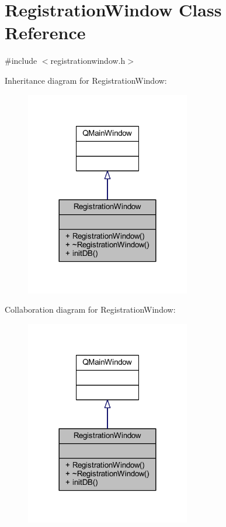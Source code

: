\hypertarget{class_registration_window}{}\section{Registration\+Window Class Reference}
\label{class_registration_window}


{\ttfamily \#include $<$registrationwindow.\+h$>$}



Inheritance diagram for Registration\+Window\+:
\nopagebreak
\begin{figure}[H]
\begin{center}
\leavevmode
\includegraphics[width=204pt]{class_registration_window__inherit__graph}
\end{center}
\end{figure}


Collaboration diagram for Registration\+Window\+:
\nopagebreak
\begin{figure}[H]
\begin{center}
\leavevmode
\includegraphics[width=204pt]{class_registration_window__coll__graph}
\end{center}
\end{figure}
